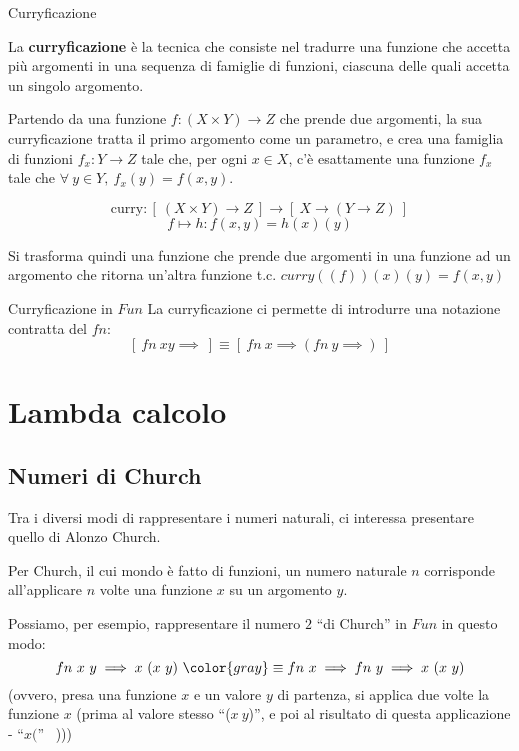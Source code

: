 \documentclass[a4paper,11pt]{report}
\begin{document}
\begin{defbox}{Curryficazione}{}

    La \textbf{curryficazione} è la tecnica che consiste nel tradurre una funzione che accetta più argomenti in una sequenza di famiglie di funzioni, ciascuna delle quali accetta un singolo argomento.


    Partendo da una funzione \( f: (X \times Y) \to Z\) che prende due argomenti, la sua curryficazione tratta il primo argomento come un parametro, e crea una famiglia di funzioni \( f_x : Y \to Z \) tale che, per ogni \( x \in X  \), c'è esattamente una funzione \( f_x \) tale che \( \forall \ y \in Y , \  f_x(y)=f(x,y)\).

    \[ \text{curry}: [ \ (X \times Y) \to Z \ ] \to [ \ X \to (Y \to Z) \ ]\]
    \[ f \mapsto h : f(x, y) = h(x)(y) \]


Si trasforma quindi una funzione che prende due argomenti in una funzione ad un argomento che ritorna un'altra funzione t.c. \( curry((f))(x)(y) = f(x, y) \)

\end{defbox}

\begin{gbox}{Curryficazione in \( Fun \)}
    La curryficazione ci permette di introdurre una notazione contratta del \( fn \):
    \[ [ \ fn \ x y \implies \ ] \equiv [ \ fn \ x \implies ( fn \ y \implies ) \ ]\]

\end{gbox}

\chapter{Lambda calcolo}
\section{Numeri di Church}
Tra i diversi modi di rappresentare i numeri naturali, ci interessa presentare quello di Alonzo Church.

Per Church, il cui mondo è fatto di funzioni, un numero naturale \( n \) corrisponde all'applicare \( n \) volte una funzione \( x \) su un argomento \( y \).
 
Possiamo, per esempio, rappresentare il numero \( 2 \) ``di Church'' in \( Fun \) in questo modo:
\[ fn \  x \ y \implies x \ (x \ y) \ {\color{gray} \equiv fn \ x \implies fn \ y \implies x \ (x \ y) }\]
    (ovvero, presa una funzione \( x \) e un valore \( y \) di partenza, si applica due volte la funzione \( x \) (prima al valore stesso ``(\( x \ y \))'', e poi al risultato di questa applicazione - ``\( x( \)'' \ )))
\end{document}

